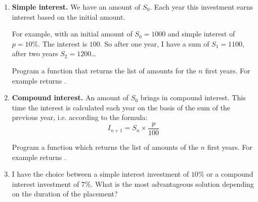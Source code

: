 \documentclass[11pt,class=report,crop=false]{standalone}
\begin{document}
\begin{activite}


\begin{enumerate}
  \item \textbf{Simple interest.} We have an amount of $S_0$. Each year this investment earns interest based on the initial amount. 
 
  For example, with an initial amount of $S_0 = 1000$ and simple interest of $p = 10 \%$. The interest is $100$. So after one year, I have a sum of $S_1=1100$, after two years $S_2 = 1200$\ldots
  
  Program a  function that returns the list of amounts for the $n$ first years. For example  returns 
  \ci{[1000, 1100, 1200, 1300]}.
  
  
  
  \item \textbf{Compound interest.} An amount of $S_0$ brings in compound interest. This time the interest is calculated each year on the basis of the sum of the previous year, i.e. according to the formula: 
  $$I_{n+1} = S_n \times \frac {p}{100}$$
  
    Program a function  which returns the list of amounts of the $n$ first years. For example  returns 
  \ci{[1000, 1100, 1210, 1331]}.
  
  
  \item I have the choice between a simple interest investment of $10\%$ or a compound interest investment of $7\%$.  What is the most advantageous solution depending on the duration of the placement? 
  
\end{enumerate}

\end{activite}

\end{document}
